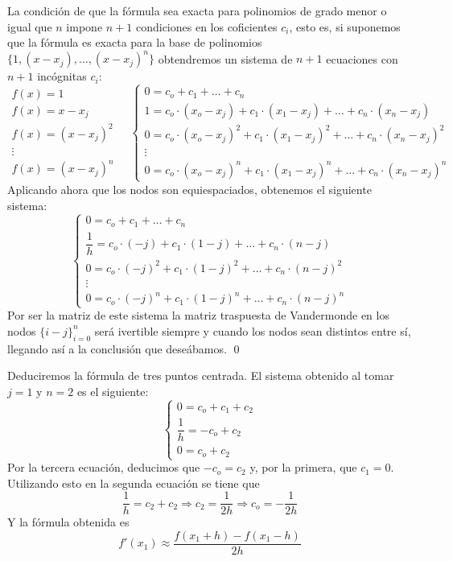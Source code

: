             \begin{dem}
            La condición de que la fórmula sea exacta para polinomios de grado menor o igual que $n$ impone $n+1$ condiciones en los coficientes $c_i$, esto es, si suponemos que la fórmula es exacta para la base de polinomios $\{1,(x-x_j),\ldots,(x-x_j)^n\}$ obtendremos un sistema de $n+1$ ecuaciones con $n+1$ incógnitas $c_i$:
            $$\begin{array}{l}
               f(x)=1    \\
            f(x)=x-x_j\\
            f(x)=(x-x_j)^2\\
            \vdots \\
            f(x)=(x-x_j)^n
            \end{array}
            \quad
            \left\{\begin{array}{l}
                0=c_o+c_1+\ldots+c_n   \\
                1=c_o\cdot(x_o-x_j)+c_1\cdot(x_1-x_j)+\ldots+c_n\cdot(x_n-x_j)\\
                0=c_o\cdot(x_o-x_j)^2+c_1\cdot(x_1-x_j)^2+\ldots+c_n\cdot(x_n-x_j)^2\\
                \vdots\\
                0=c_o\cdot(x_o-x_j)^n+c_1\cdot(x_1-x_j)^n+\ldots+c_n\cdot(x_n-x_j)^n
            \end{array}\right.$$
            Aplicando ahora que los nodos son equiespaciados, obtenemos el siguiente sistema:
                        $$ \left\{\begin{array}{l}
                0=c_o+c_1+\ldots+c_n   \\
                \dfrac{1}{h}=c_o\cdot(-j)+c_1\cdot(1-j)+\ldots+c_n\cdot(n-j)\\
                0=c_o\cdot(-j)^2+c_1\cdot(1-j)^2+\ldots+c_n\cdot(n-j)^2\\
                \vdots\\
                0=c_o\cdot(-j)^n+c_1\cdot(1-j)^n+\ldots+c_n\cdot(n-j)^n
            \end{array}\right.$$
            Por ser la matriz de este sistema la matriz traspuesta de Vandermonde en los nodos $\{i-j\}_{i=0}^n$ será ivertible siempre y cuando los nodos sean distintos entre sí, llegando así a la conclusión que deseábamos.
            \qed\end{dem}
            \begin{ejem}
        Deduciremos la fórmula de tres puntos centrada. El sistema obtenido al tomar $j=1$ y $n=2$ es el siguiente:
        $$ \left\{\begin{array}{l}
                0=c_o+c_1+c_2   \\
                \dfrac{1}{h}=-c_o+c_2\\
                0=c_o+c_2
            \end{array}\right.$$
        Por la tercera ecuación, deducimos que $-c_o=c_2$ y, por la primera, que $c_1=0$. Utilizando esto en la segunda ecuación se tiene que
        $$\dfrac{1}{h}=c_2+c_2\Longrightarrow c_2=\dfrac{1}{2h}\Longrightarrow c_o=-\dfrac{1}{2h}$$
        Y la fórmula obtenida es
        $$f'(x_1)\approx\dfrac{f(x_1+h)-f(x_1-h)}{2h}$$
        \end{ejem}
